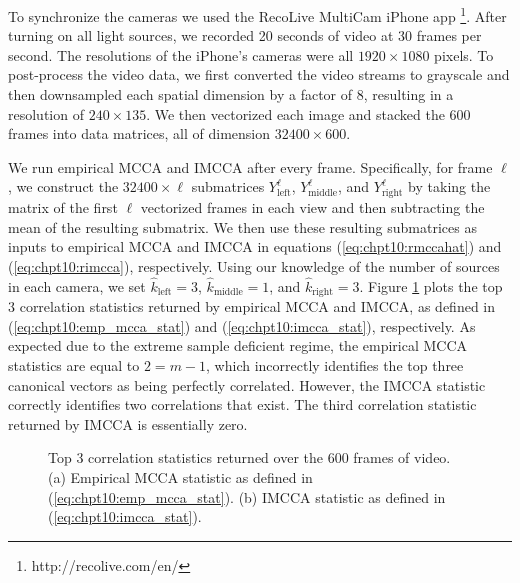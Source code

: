 To synchronize the cameras we used the RecoLive MultiCam iPhone app
\footnote{http://recolive.com/en/}. After turning on all light sources, we recorded 20
seconds of video at 30 frames per second. The resolutions of the iPhone's cameras were all
$1920\times 1080$ pixels. To post-process the video data, we first converted the video
streams to grayscale and then downsampled each spatial dimension by a factor of 8,
resulting in a resolution of $240\times 135$. We then vectorized each image and stacked
the 600 frames into data matrices, all of dimension $32400 \times 600$.

We run empirical MCCA and IMCCA after every frame. Specifically, for frame $\ell$, we
construct the $32400\times \ell$ submatrices $Y_{\text{left}}^{\ell}$,
$Y_{\text{middle}}^{\ell}$, and $Y_{\text{right}}^{\ell}$ by taking the matrix of the
first $\ell$ vectorized frames in each view and then subtracting the mean of the
resulting submatrix. We then use these resulting submatrices as inputs to empirical MCCA
and IMCCA in equations (\ref{eq:chpt10:rmccahat}) and (\ref{eq:chpt10:rimcca}),
respectively. Using our knowledge of the number of sources in each camera, we set
$\widehat{k}_{\text{left}}=3$, $\widehat{k}_{\text{middle}}=1$, and
$\widehat{k}_{\text{right}}=3$. Figure \ref{fig:chpt10:mcca_corrs} plots the top 3
correlation statistics returned by empirical MCCA and IMCCA, as defined in
(\ref{eq:chpt10:emp_mcca_stat}) and (\ref{eq:chpt10:imcca_stat}), respectively. As
expected due to the extreme sample deficient regime, the empirical MCCA statistics are
equal to $2=m-1$, which incorrectly identifies the top three canonical vectors as being
perfectly correlated. However, the IMCCA statistic correctly identifies two correlations
that exist. The third correlation statistic returned by IMCCA is essentially zero.

\begin{figure}
  \begin{center}
    \caption{Top 3 correlation statistics returned over the 600 frames of video. (a)
      Empirical MCCA statistic as defined in (\ref{eq:chpt10:emp_mcca_stat}). (b) IMCCA
      statistic as defined in (\ref{eq:chpt10:imcca_stat}).}
    \label{fig:chpt10:mcca_corrs}
  \end{center}
\end{figure}

